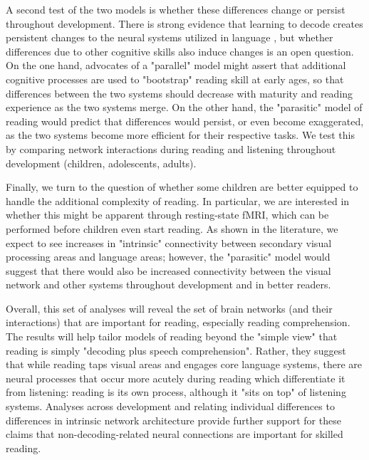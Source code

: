 A second test of the two models is whether these differences change or persist throughout development. There is strong evidence that learning to decode creates persistent changes to the neural systems utilized in language \citep{SeidenbergXXXX, DahaeneXXXX}, but whether differences due to other cognitive skills also induce changes is an open question. On the one hand, advocates of a "parallel" model might assert that additional cognitive processes are used to "bootstrap" reading skill at early ages, so that differences between the two systems should decrease with maturity and reading experience as the two systems merge. On the other hand, the "parasitic" model of reading would predict that differences would persist, or even become exaggerated, as the two systems become more efficient for their respective tasks. We test this by comparing network interactions during reading and listening throughout development (children, adolescents, adults).  

Finally, we turn to the question of whether some children are better equipped to handle the additional complexity of reading. In particular, we are interested in whether this  might be apparent through resting-state fMRI, which can be performed before children even start reading. As shown in the literature, we expect to see increases in "intrinsic" connectivity between secondary visual processing areas and language areas; however, the "parasitic" model would suggest that there would also be increased connectivity between the visual network and other systems throughout development and in better readers. 

Overall, this set of analyses will reveal the set of brain networks (and their interactions) that are important for reading, especially reading comprehension. The results will help tailor models of reading beyond the "simple view" that reading is simply "decoding plus speech comprehension". Rather, they suggest that while reading taps visual areas and engages core language systems, there are neural processes that occur more acutely during reading which differentiate it from listening: reading is its own process, although it "sits on top" of listening systems. Analyses across development and relating individual differences to differences in intrinsic network architecture provide further support for these claims that non-decoding-related neural connections are important for skilled reading. 
